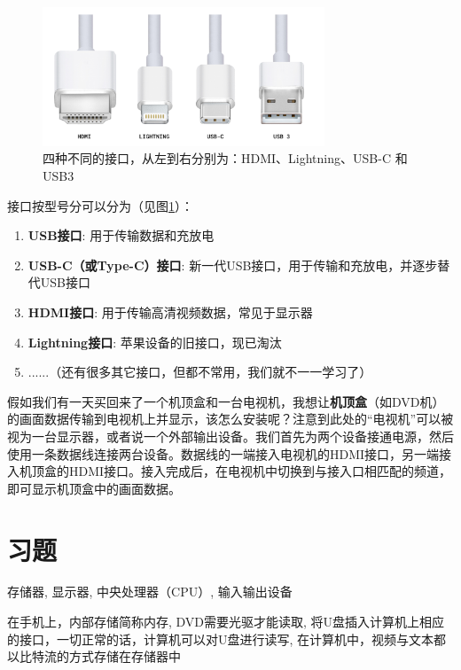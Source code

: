 \begin{figure}[htbp]
    \centering
    \includegraphics[width=0.75\textwidth]{images/ch2/four_interfaces}
    \caption{
        四种不同的接口，从左到右分别为：HDMI、Lightning、USB-C 和 USB3
    }
    \label{fig:cpu_four_interfaces}
\end{figure}

接口按型号分可以分为（见图\ref{fig:cpu_four_interfaces}）：

\begin{enumerate}
    \item { \textbf{USB接口}: 用于传输数据和充放电 }
    \item { \textbf{USB-C（或Type-C）接口}: 新一代USB接口，用于传输和充放电，并逐步替代USB接口 }
    \item { \textbf{HDMI接口}: 用于传输高清视频数据，常见于显示器 }
    \item { \textbf{Lightning接口}: 苹果设备的旧接口，现已淘汰 }
    \item { ......（还有很多其它接口，但都不常用，我们就不一一学习了） }
\end{enumerate}

假如我们有一天买回来了一个机顶盒和一台电视机，我想让\textbf{机顶盒}（如DVD机）的画面数据传输到电视机上并显示，该怎么安装呢？注意到此处的“电视机”可以被视为一台显示器，或者说一个外部输出设备。我们首先为两个设备接通电源，然后使用一条数据线连接两台设备。数据线的一端接入电视机的HDMI接口，另一端接入机顶盒的HDMI接口。接入完成后，在电视机中切换到与接入口相匹配的频道，即可显示机顶盒中的画面数据。


\section{习题}\label{sec:arch:exercise}

 {
    存储器,
    显示器,
    中央处理器（CPU）,
    输入输出设备
}

 {
    在手机上，内部存储简称内存,
    DVD需要光驱才能读取,
    将U盘插入计算机上相应的接口，一切正常的话，计算机可以对U盘进行读写,
    在计算机中，视频与文本都以比特流的方式存储在存储器中
}

